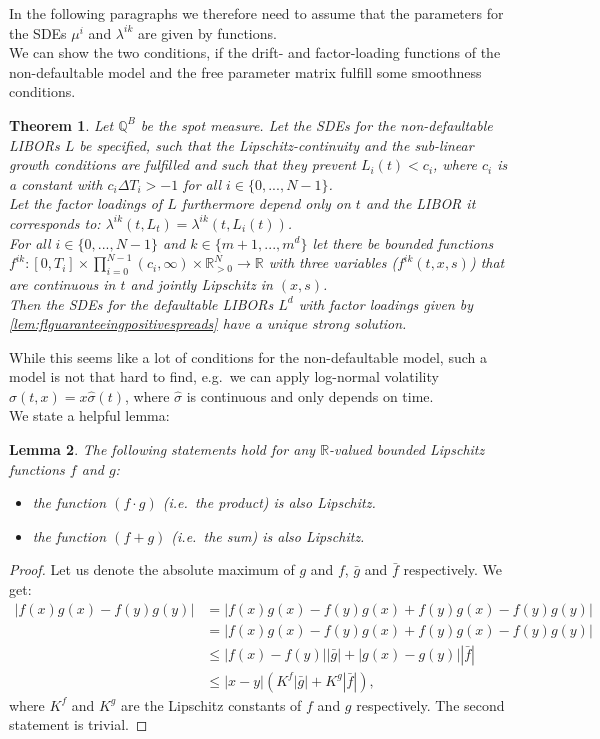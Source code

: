\documentclass[12pt]{article}
\newtheorem{theorem}{Theorem}[section]
\newtheorem{lemma}[theorem]{Lemma}
\begin{document}
	In the following paragraphs we therefore need to assume that the parameters for the SDEs $\mu^{i}$ and $\lambda^{i k}$ are given by functions.\\
	We can show the two conditions, if the drift- and factor-loading  functions of the non-defaultable model and the free parameter matrix fulfill some smoothness conditions.
	\begin{theorem}\label{theo:existence}
		Let $\mathbb{Q}^B$ be the spot measure. 
		Let the SDEs for the non-defaultable LIBORs $L$ be specified, such that the Lipschitz-continuity and the sub-linear growth conditions are fulfilled and such that they prevent $L_i(t) < c_i$, where $c_i$ is a constant with $c_i\Delta T_i > -1$ for all $i \in \{0, ..., N-1\}$. \\
		Let the factor loadings of $L$ furthermore depend only on $t$ and the LIBOR it corresponds to: $\lambda^{i k}(t, L_t) = \lambda^{i k}(t,L_i(t))$.\\
		For all $i\in\{0, ..., N-1\}$ and $k \in \{m+1, ..., m^d\}$ let there be bounded functions $f^{i k}: \left[0,T_i\right]\times \prod_{i=0}^{N-1}\left(c_i,\infty\right)\times \mathbb{R}_{>0}^N \rightarrow\mathbb{R}$ with three variables ($f^{i k}(t,x,s)$) that are continuous in $t$ and jointly Lipschitz in $(x,s)$.\\
		Then the SDEs for the defaultable LIBORs $L^d$ with factor loadings given by \cref{lem:flguaranteeingpositivespreads} have a unique strong solution.
	\end{theorem}
	While this seems like a lot of conditions for the non-defaultable model, such a model is not that hard to find, e.g.\ we can apply log-normal volatility $\sigma(t,x) = x\hat{\sigma}(t)$, where $\hat{\sigma}$ is continuous and only depends on time.\\
	We state a helpful lemma:
	\begin{lemma}\label{lem:basicLipschitz}
		The following statements hold for any $\mathbb{R}$-valued bounded Lipschitz functions $f$ and $g$:
		\begin{itemize}
			\item the function $(f\cdot g)$ (i.e.\ the product) is also Lipschitz.
			\item the function $(f + g)$ (i.e.\ the sum) is also Lipschitz.
		\end{itemize}
	\end{lemma}
	\begin{proof}
		Let us denote the absolute maximum of $g$ and $f$, $\bar{g}$ and $\bar{f}$ respectively. We get:
		\begin{align*}
			|f(x)g(x) - f(y)g(y) | &= | f(x)g(x) - f(y)g(x) + f(y)g(x) - f(y)g(y)|\\
			&= | f(x)g(x) - f(y)g(x) + f(y)g(x) - f(y)g(y) |\\
			&\le | f(x) - f(y)| | \bar{g} | + | g(x) - g(y)| | \bar{f} |\\
			&\le | x - y| \left(K^f| \bar{g} | + K^g| \bar{f} |\right),
		\end{align*}
		where $K^f$ and $K^g$ are the Lipschitz constants of $f$ and $g$ respectively.
		The second statement is trivial.
	\end{proof}
\end{document}
